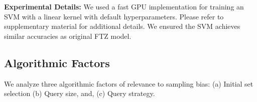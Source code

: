 \documentclass[11pt,a4paper]{article}
\begin{document}
\textbf{Experimental Details:} We used a fast GPU implementation for training an SVM with a linear kernel \cite{wen2018thundersvm} with  default hyperparameters. Please refer to supplementary material for additional details. We ensured the SVM achieves similar accuracies as original FTZ model.

\subsection{Algorithmic Factors}\label{sec:causes}

We analyze three algorithmic factors of relevance to sampling bias: (a) Initial set selection (b) Query size, and, (c) Query strategy.
\begin{table*}[t]

\caption{Intersection of query strategies across acquisition functions. We observe that the \% intersection among samples in the Ent-LC is comparable to those Ent-Ent. Similarly, the Ent-DelEnt (entropy with deletion) is comparable to both DelEnt-DelLC and DelEnt-DelEnt showing robustness of FastText to query functions (beyond minor variation). DelEnt-DelEnt obtains similar intersections as compared to Ent-Ent, showing the robustness of the acquired samples to deletion.} 
\label{tab:query_acquisition}
\end{table*}
\end{document}
